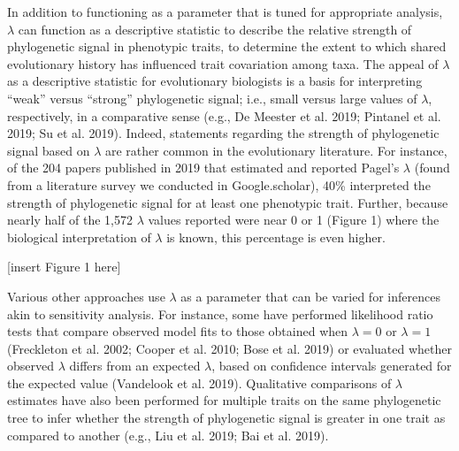 \documentclass[
]{article}
\begin{document}
In addition to functioning as a parameter that is tuned for appropriate
analysis, \(\lambda\) can function as a descriptive statistic to
describe the relative strength of phylogenetic signal in phenotypic
traits, to determine the extent to which shared evolutionary history has
influenced trait covariation among taxa. The appeal of \(\lambda\) as a
descriptive statistic for evolutionary biologists is a basis for
interpreting ``weak'' versus ``strong'' phylogenetic signal; i.e., small
versus large values of \(\lambda\), respectively, in a comparative sense
(e.g., De Meester et al. 2019; Pintanel et al. 2019; Su et al. 2019).
Indeed, statements regarding the strength of phylogenetic signal based
on \(\lambda\) are rather common in the evolutionary literature. For
instance, of the 204 papers published in 2019 that estimated and
reported Pagel's \(\lambda\) (found from a literature survey we
conducted in Google.scholar), 40\% interpreted the strength of
phylogenetic signal for at least one phenotypic trait. Further, because
nearly half of the 1,572 \(\lambda\) values reported were near 0 or 1
(Figure 1) where the biological interpretation of \(\lambda\) is known,
this percentage is even higher. \hfill\break

{[}insert Figure 1 here{]} \hfill\break

Various other approaches use \(\lambda\) as a parameter that can be
varied for inferences akin to sensitivity analysis. For instance, some
have performed likelihood ratio tests that compare observed model fits
to those obtained when \(\lambda=0\) or \(\lambda=1\) (Freckleton et al.
2002; Cooper et al. 2010; Bose et al. 2019) or evaluated whether
observed \(\lambda\) differs from an expected \(\lambda\), based on
confidence intervals generated for the expected value (Vandelook et al.
2019). Qualitative comparisons of \(\lambda\) estimates have also been
performed for multiple traits on the same phylogenetic tree to infer
whether the strength of phylogenetic signal is greater in one trait as
compared to another (e.g., Liu et al. 2019; Bai et al. 2019).
\hfill\break
\end{document}
